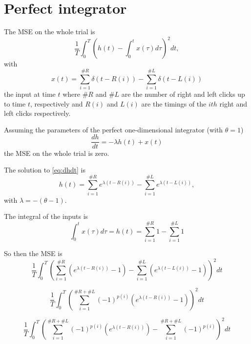 \documentclass{article}
\theoremstyle{definition}
\theoremstyle{remark}
\begin{document}
\section{Perfect integrator}
The MSE on the whole trial is 
\[
\frac{1}{T}\int_0^T \left( h(t) - \int_0^t x(\tau)d\tau\right)^2 dt,
\]
with \[x(t) = \sum_{i=1}^{\# R}\delta(t-R(i))-\sum_{i=1}^{\# L}\delta(t-L(i))\] the input at time $t$ where $\#R$ and $\#L$ are the number of right and left clicks up to time $t$, respectively and $R(i)$ and $L(i)$ are the timings of the $ith$ right and left clicks respectively. 

Assuming the parameters of the perfect one-dimensional integrator (with $\theta=1$)
\begin{equation}\label{eq:dhdt}
\frac{dh}{dt} = -\lambda h(t) + x(t)    
\end{equation}
the MSE on the whole trial is zero.

The solution to \eqref{eq:dhdt} is
\begin{equation}
    h(t) = \sum_{i=1}^{\# R}e^{\lambda(t-R(i))}-\sum_{i=1}^{\# L}e^{\lambda(t-L(i))},
\end{equation}
with $\lambda=-(\theta-1)$.

The integral of the inputs is
\[
\int_0^t x(\tau)d\tau = h(t) = \sum_{i=1}^{\# R}1-\sum_{i=1}^{\# L}1
\]

So then the MSE is
\[
\frac{1}{T}\int_0^T \left(\sum_{i=1}^{\# R}(e^{\lambda(t-R(i))}-1)-\sum_{i=1}^{\# L}(e^{\lambda(t-L(i))}-1)\right)^2 dt
\]


\[
\frac{1}{T}\int_0^T \left(\sum_{i=1}^{\# R + \#L}(-1)^{p(i)}(e^{\lambda(t-R(i))}-1)\right)^2 dt
\]

\[
\frac{1}{T}\int_0^T \left(\sum_{i=1}^{\# R + \#L}(-1)^{p(i)}(e^{\lambda(t-R(i))})-\sum_{i=1}^{\# R + \#L}(-1)^{p(i)}\right)^2 dt
\]
\end{document}
